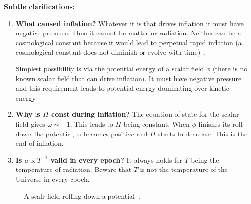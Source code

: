 \begin{mycolorbox}
      \textbf{Subtle clarifications:}
  
\begin{enumerate}
      \item \textbf{What caused inflation?}
             Whatever it is that drives inflation it must have negative pressure. Thus it cannot be matter or radiation.
             Neither can be a cosmological constant because it would lead to perpetual rapid inflation (a cosmological constant does not diminish or evolve with time)~\cite{ModernCosm}.
  
             Simplest possibility is via the potential energy of a scalar field $\phi$ (there
             is no known scalar field that can drive inflation). It must have negative pressure and this requirement leads to potential energy dominating over kinetic energy.
      \item \textbf{Why is $H$ const during inflation?} The equation of state for the scalar field gives $\omega \sim -1$. This leads to $H$ being constant. When $\phi$ finishes its roll down the potential, $\omega$ becomes positive and $H$ starts to decrease. This is the end of inflation.
      \item \textbf{Is $a \propto T^{-1}$ valid in every epoch?} It always holds for $T$ being the temperature of radiation. Beware that $T$ is not the temperature of the Universe in every epoch.
  \end{enumerate}
\end{mycolorbox}
\begin{figure}[h]
      \centering
      \caption{A scalr field rolling down a potential~\cite{ModernCosm}.}
  \end{figure}
